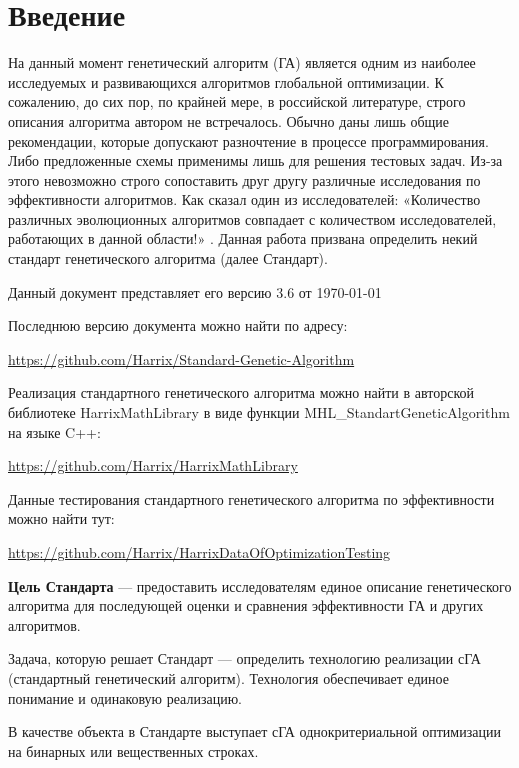 \chapter*{Введение}
\singlespacing
На данный момент генетический алгоритм (ГА) является одним из наиболее исследуемых и развивающихся алгоритмов глобальной оптимизации. К сожалению, до сих пор, по крайней мере, в российской литературе, строго описания алгоритма автором не встречалось. Обычно даны лишь общие рекомендации, которые допускают разночтение в процессе программирования. Либо предложенные схемы применимы лишь для решения тестовых задач. Из-за этого невозможно строго сопоставить друг другу различные исследования по эффективности алгоритмов. Как сказал один из исследователей: «Количество различных эволюционных алгоритмов совпадает с количеством исследователей, работающих в данной области!» \cite{web:makeingsimpleGA}. Данная работа призвана определить некий стандарт генетического алгоритма (далее Стандарт).

Данный документ представляет его версию 3.6 от \today

Последнюю версию документа можно найти по адресу:

\href{https://github.com/Harrix/Standard-Genetic-Algorithm}{https://github.com/Harrix/Standard-Genetic-Algorithm}

Реализация стандартного генетического алгоритма можно найти в авторской библиотеке HarrixMathLibrary в виде функции MHL\_StandartGeneticAlgorithm на языке C++:

\href{https://github.com/Harrix/HarrixMathLibrary}{https://github.com/Harrix/HarrixMathLibrary}

Данные тестирования стандартного генетического алгоритма по эффективности можно найти тут:

\href{https://github.com/Harrix/HarrixDataOfOptimizationTesting}{https://github.com/Harrix/HarrixDataOfOptimizationTesting}

\textbf{Цель Стандарта} --- предоставить исследователям единое описание генетического алгоритма для последующей оценки и сравнения эффективности ГА и других алгоритмов. 

Задача, которую решает Стандарт --- определить технологию реализации сГА (стандартный генетический алгоритм). Технология обеспечивает единое понимание и одинаковую реализацию.

В качестве объекта в Стандарте выступает сГА однокритериальной оптимизации на бинарных или вещественных строках.

